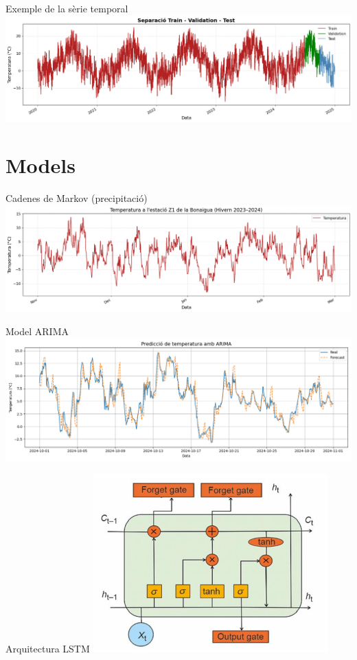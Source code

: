 \documentclass[mathserif, aspectratio=169]{beamer}
\begin{document}
\begin{frame}{Exemple de la sèrie temporal}
  \includegraphics[width=\linewidth]{figures/lstm/data/data_splits_plot.png}
\end{frame}

\section{Models}

\begin{frame}{Cadenes de Markov (precipitació)}
  \includegraphics[width=0.9\linewidth]{figures/markov/1.png}
\end{frame}

\begin{frame}{Model ARIMA}
  \includegraphics[width=0.9\linewidth]{figures/arima/C1_plot.png}
\end{frame}

\begin{frame}{Arquitectura LSTM}
  \includegraphics[width=0.9\linewidth]{figures/lstm/concept/1_lstm_cell.png}
\end{frame}
\end{document}
